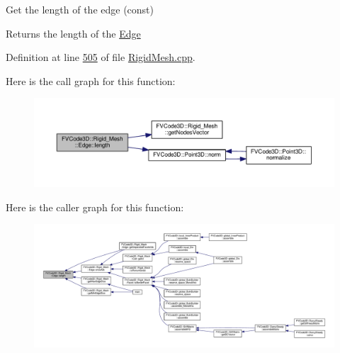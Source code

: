 Get the length of the edge (const) 

\begin{DoxyReturn}{Returns}
the length of the \hyperlink{classFVCode3D_1_1Rigid__Mesh_1_1Edge}{Edge} 
\end{DoxyReturn}


Definition at line \hyperlink{RigidMesh_8cpp_source_l00505}{505} of file \hyperlink{RigidMesh_8cpp_source}{Rigid\+Mesh.\+cpp}.



Here is the call graph for this function\+:
\nopagebreak
\begin{figure}[H]
\begin{center}
\leavevmode
\includegraphics[width=350pt]{classFVCode3D_1_1Rigid__Mesh_1_1Edge_a3ef3549d709a4b537437f9e3e7f3e67b_cgraph}
\end{center}
\end{figure}




Here is the caller graph for this function\+:
\nopagebreak
\begin{figure}[H]
\begin{center}
\leavevmode
\includegraphics[width=350pt]{classFVCode3D_1_1Rigid__Mesh_1_1Edge_a3ef3549d709a4b537437f9e3e7f3e67b_icgraph}
\end{center}
\end{figure}


